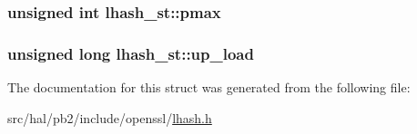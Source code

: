 \subsubsection[{\texorpdfstring{pmax}{pmax}}]{\setlength{\rightskip}{0pt plus 5cm}unsigned int lhash\+\_\+st\+::pmax}\hypertarget{structlhash__st_a4b7d60fb615541278ab1d04b94a5d209}{}\label{structlhash__st_a4b7d60fb615541278ab1d04b94a5d209}
\subsubsection[{\texorpdfstring{up\+\_\+load}{up_load}}]{\setlength{\rightskip}{0pt plus 5cm}unsigned long lhash\+\_\+st\+::up\+\_\+load}\hypertarget{structlhash__st_a1a393608789b64b8a28fa35bf8181ccf}{}\label{structlhash__st_a1a393608789b64b8a28fa35bf8181ccf}


The documentation for this struct was generated from the following file\+:\begin{DoxyCompactItemize}
\item 
src/hal/pb2/include/openssl/\hyperlink{lhash_8h}{lhash.\+h}\end{DoxyCompactItemize}
